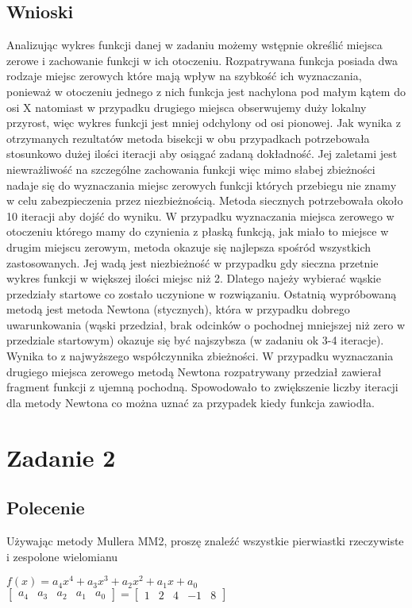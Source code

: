 \documentclass[a4paper, 11pt]{article}
\begin{document}
\subsection{Wnioski}
Analizując wykres funkcji danej w zadaniu możemy wstępnie określić miejsca zerowe i zachowanie funkcji w ich otoczeniu. Rozpatrywana funkcja posiada dwa rodzaje miejsc zerowych które mają wpływ na szybkość ich wyznaczania, ponieważ w otoczeniu jednego z nich funkcja jest nachylona pod małym kątem do osi X natomiast w przypadku drugiego miejsca obserwujemy duży lokalny przyrost, więc wykres funkcji jest mniej odchylony od osi pionowej. Jak wynika z otrzymanych rezultatów metoda bisekcji w obu przypadkach potrzebowała stosunkowo dużej ilości iteracji aby osiągać zadaną dokładność. Jej zaletami jest niewrażliwość na szczególne zachowania funkcji więc mimo słabej zbieżności nadaje się do wyznaczania miejsc zerowych funkcji których przebiegu nie znamy w celu zabezpieczenia przez niezbieżnością. Metoda siecznych potrzebowała około 10 iteracji aby dojść do wyniku. W przypadku wyznaczania miejsca zerowego w otoczeniu którego mamy do czynienia z płaską funkcją, jak miało to miejsce w drugim miejscu zerowym, metoda okazuje się najlepsza spośród wszystkich zastosowanych. Jej wadą jest niezbieżność w przypadku gdy sieczna przetnie wykres funkcji w większej ilości miejsc niż 2. Dlatego najeży wybierać wąskie przedziały startowe co zostało uczynione w rozwiązaniu. Ostatnią wypróbowaną metodą jest metoda Newtona (stycznych), która w przypadku dobrego uwarunkowania (wąski przedział, brak odcinków o pochodnej mniejszej niż zero w przedziale startowym) okazuje się być najszybsza (w zadaniu ok 3-4 iteracje). Wynika to z najwyższego współczynnika zbieżności. W przypadku wyznaczania drugiego miejsca zerowego metodą Newtona rozpatrywany przedział zawierał fragment funkcji z ujemną pochodną. Spowodowało to zwiększenie liczby iteracji dla metody Newtona co można uznać za przypadek kiedy funkcja zawiodła. 


\section{Zadanie 2}

\subsection{Polecenie}
Używając metody Mullera MM2, proszę znaleźć wszystkie pierwiastki rzeczywiste i zespolone wielomianu
\begin{center}
$f(x) = a_{4}x^4+a_{3}x^3+a_{2}x^2+a_{1}x+a_{0}$ 
$
\left[
\begin{array}{ccccc}
       a_{4} & a_{3} & a_{2} & a_{1} & a_{0}
\end{array}
\right]
=
\left[
\begin{array}{ccccc}
       1 & 2 & 4 & -1 & 8
\end{array}
\right]$
\end{center}
\end{document}
